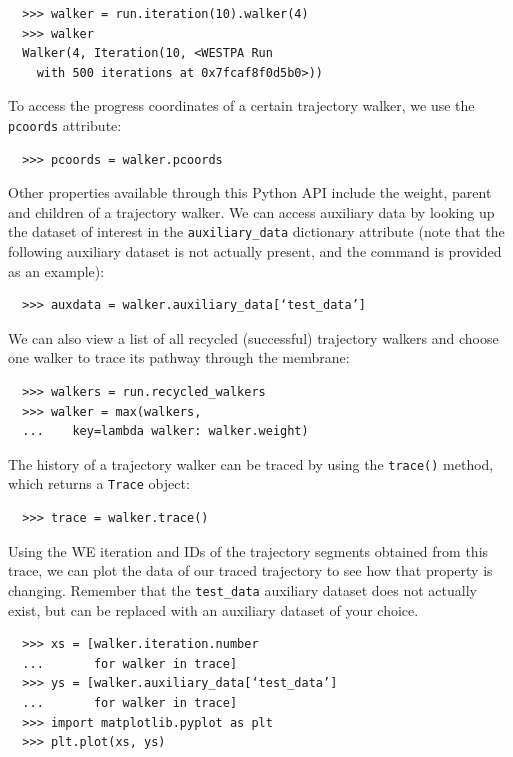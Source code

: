 \begin{verbatim}
  >>> walker = run.iteration(10).walker(4)
  >>> walker
  Walker(4, Iteration(10, <WESTPA Run
    with 500 iterations at 0x7fcaf8f0d5b0>))
\end{verbatim}

To access the progress coordinates of a certain trajectory walker, we use the \verb|pcoords| attribute:

\begin{verbatim}
  >>> pcoords = walker.pcoords
\end{verbatim}

Other properties available through this Python API include the weight, parent and children of a trajectory walker.
We can access auxiliary data by looking up the dataset of interest in the \verb|auxiliary_data| dictionary attribute (note that the following auxiliary dataset is not actually present, and the command is provided as an example):

\begin{verbatim}
  >>> auxdata = walker.auxiliary_data[‘test_data’]
\end{verbatim}

We can also view a list of all recycled (successful) trajectory walkers and choose one walker to trace its pathway through the membrane:

\begin{verbatim}
  >>> walkers = run.recycled_walkers
  >>> walker = max(walkers, 
  ...    key=lambda walker: walker.weight)
\end{verbatim}

The history of a trajectory walker can be traced by using the \verb|trace()| method, which returns a \verb|Trace| object:

\begin{verbatim}
  >>> trace = walker.trace()
\end{verbatim}

Using the WE iteration and IDs of the trajectory segments obtained from this trace, we can plot the data of our traced trajectory to see how that property is changing.
Remember that the \verb|test_data| auxiliary dataset does not actually exist, but can be replaced with an auxiliary dataset of your choice.

\begin{verbatim}
  >>> xs = [walker.iteration.number 
  ...       for walker in trace]
  >>> ys = [walker.auxiliary_data[‘test_data’] 
  ...       for walker in trace]
  >>> import matplotlib.pyplot as plt
  >>> plt.plot(xs, ys)
\end{verbatim}

